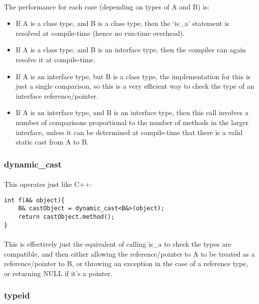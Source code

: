 \documentclass[12pt,twoside,notitlepage]{report}
\begin{document}
\paragraph{}
The performance for each case (depending on types of A and B) is:

\begin{itemize}
\item If A is a class type, and B is a class type, then the `is\_a' statement is resolved at compile-time (hence no run-time overhead).
\item If A is a class type, and B is an interface type, then the compiler can again resolve it at compile-time.
\item If A is an interface type, but B is a class type, the implementation for this is just a single comparison, so this is a very efficient way to check the type of an interface reference/pointer.
\item If A is an interface type, and B is an interface type, then this call involves a number of comparisons proportional to the number of methods in the larger interface, unless it can be determined at compile-time that there is a valid static cast from A to B.
\end{itemize}

\subsubsection{dynamic\_cast}

\paragraph{}
This operates just like C++:

\begin{lstlisting}
int f(A& object){
	B& castObject = dynamic_cast<B&>(object);
	return castObject.method();
}
\end{lstlisting}

\paragraph{}
This is effectively just the equivalent of calling is\_a to check the types are compatible, and then either allowing the reference/pointer to A to be treated as a reference/pointer to B, or throwing an exception in the case of a reference type, or returning NULL if it's a pointer.

\subsubsection{typeid}
\end{document}
